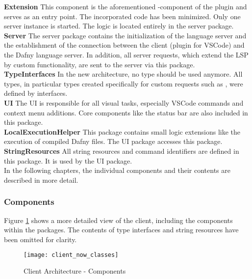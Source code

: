 {\bf Extension} \textendash{}
This component is the aforementioned -component of the plugin and serves as an entry point.
The incorporated code has been minimized.
Only one server instance is started.
The logic is located entirely in the server package.\\

{\bf Server} \textendash{}
The server package contains the initialization of the language server and the establishment of the connection between the client (plugin for VSCode) and the Dafny language server.
In addition, all server requests, which extend the LSP by custom functionality, are sent to the server via this package.\\

{\bf TypeInterfaces} \textendash{}
In the new architecture, no  type should be used anymore.
All types, in particular types created specifically for custom requests such as , were defined by interfaces. \\

{\bf UI} \textendash{}
The UI is responsible for all visual tasks, especially VSCode commands and context menu additions.
Core components like the status bar are also included in this package.\\

{\bf LocalExecutionHelper} \textendash{}
This package contains small logic extensions like the execution of compiled Dafny files.
The UI package accesses this package.\\

{\bf StringResources} \textendash{} 
All string resources and command identifiers are defined in this package.
It is used by the UI package. \\

In the following chapters, the individual components and their contents are described in more detail.

\subsubsection{Components}
Figure \ref{fig:client_now_classes} shows a more detailed view of the client, including the components within the packages.
The contents of type interfaces and string resources have been omitted for clarity.\\

\begin{figure}[H]
    \centering
    \texttt{[image: client\_now\_classes]}
    \caption{Client Architecture - Components}
    \label{fig:client_now_classes}
\end{figure}

